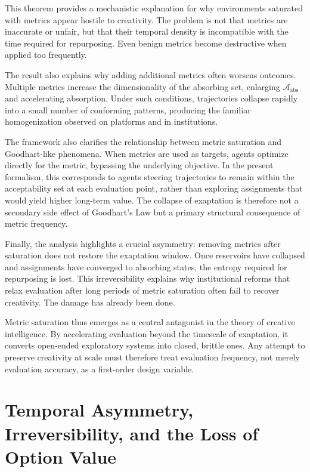 \documentclass[11pt]{article}
\theoremstyle{definition}
\begin{document}
This theorem provides a mechanistic explanation for why environments saturated with metrics appear hostile to creativity. The problem is not that metrics are inaccurate or unfair, but that their temporal density is incompatible with the time required for repurposing. Even benign metrics become destructive when applied too frequently.

The result also explains why adding additional metrics often worsens outcomes. Multiple metrics increase the dimensionality of the absorbing set, enlarging $\mathcal{A}_{\mathrm{abs}}$ and accelerating absorption. Under such conditions, trajectories collapse rapidly into a small number of conforming patterns, producing the familiar homogenization observed on platforms and in institutions.

The framework also clarifies the relationship between metric saturation and Goodhart-like phenomena. When metrics are used as targets, agents optimize directly for the metric, bypassing the underlying objective. In the present formalism, this corresponds to agents steering trajectories to remain within the acceptability set at each evaluation point, rather than exploring assignments that would yield higher long-term value. The collapse of exaptation is therefore not a secondary side effect of Goodhart’s Law but a primary structural consequence of metric frequency.

Finally, the analysis highlights a crucial asymmetry: removing metrics after saturation does not restore the exaptation window. Once reservoirs have collapsed and assignments have converged to absorbing states, the entropy required for repurposing is lost. This irreversibility explains why institutional reforms that relax evaluation after long periods of metric saturation often fail to recover creativity. The damage has already been done.

Metric saturation thus emerges as a central antagonist in the theory of creative intelligence. By accelerating evaluation beyond the timescale of exaptation, it converts open-ended exploratory systems into closed, brittle ones. Any attempt to preserve creativity at scale must therefore treat evaluation frequency, not merely evaluation accuracy, as a first-order design variable.

\section{Temporal Asymmetry, Irreversibility, and the Loss of Option Value}
\end{document}
